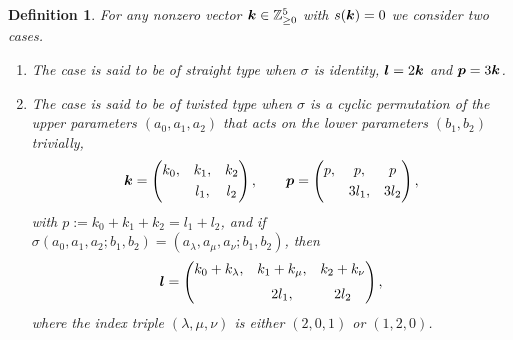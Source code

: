 \documentclass[a4paper,12pt]{article}
\theoremstyle{plain}
\newtheorem{definition}[theorem]{Definition}
\def\Z{\mathbb{Z}}
\def\bk{\mbox{\boldmath $k$}}
\def\bl{\mbox{\boldmath $l$}}
\def\bp{\mbox{\boldmath $p$}}
\begin{document}
\begin{definition} \label{def:admissible} 
For any nonzero vector $\bk \in \Z_{\ge0}^5$ with $s(\bk) = 0$ 
we consider two cases.         
\begin{enumerate} 
\item The case is said to be {\sl of  straight type} when $\sigma$ is identity, 
$\bl = 2 \bk$ and $\bp = 3 \bk$.     
\item The case is said to be {\sl of twisted type} when $\sigma$ is a cyclic 
permutation of  the upper parameters $(a_0, a_1, a_2)$ that acts    
on the lower parameters $(b_1, b_2)$ trivially,        
\begin{equation}  \label{eqn:adm-kp} 
\bk = 
\begin{pmatrix} 
k_0, & k_1, & k_2 \\[1mm] 
     & l_1, & l_2 
\end{pmatrix}, 
\qquad 
\bp = 
\begin{pmatrix} 
p, & p, & p \\[1mm]
 & 3 l_1, & 3 l_2 
\end{pmatrix}, 
\end{equation}
with $p := k_0+k_1+k_2 = l_1 + l_2$, and 
if $\sigma(a_0,a_1,a_2; b_1, b_2) = (a_{\lambda}, a_{\mu}, a_{\nu}; b_1, b_2)$, then  
\begin{equation} \label{eqn:cyclic}   
\bl = 
\begin{pmatrix} 
k_0 + k_{\lambda}, & k_1 + k_{\mu},  & k_2 + k_{\nu} \\[2mm] 
           & 2 l_1,      &  2 l_2  
\end{pmatrix},  
\end{equation}  
where the index triple $(\lambda, \mu, \nu)$ is either $(2, 0, 1)$ or $(1, 2, 0)$.  
\end{enumerate}
\end{definition}
\end{document}
